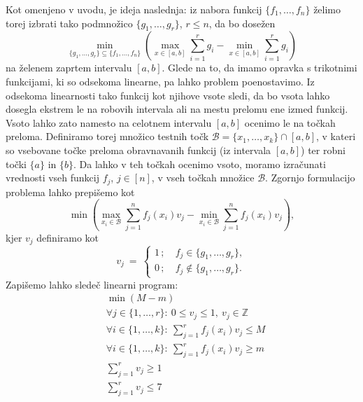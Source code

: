 \documentclass[11pt]{article}
\theoremstyle{definition}
\newcommand{\Z}{\mathbb{Z}}
\newcommand{\1}{\mathbbm{1}}
\newcommand{\set}[1]{\{#1\}}
\newcommand{\B}{\mathcal{B}}
\begin{document}
Kot omenjeno v uvodu, je ideja naslednja: iz nabora funkcij $\set{f_1,\ldots,f_n}$ želimo torej izbrati tako podmnožico $\set{g_1,\ldots,g_r}$, $r \leq n$, da bo dosežen
$$\min_{\set{g_1,\ldots,g_r} \subseteq \set{f_1,\ldots,f_n}}\left({\max_{x \in [a,b]}\sum_{i=1}^r g_i - \min_{x \in [a,b]}\sum_{i=1}^r g_i}\right)$$
na želenem zaprtem intervalu $[a,b]$. Glede na to, da imamo opravka s trikotnimi funkcijami, ki so odsekoma linearne, pa lahko problem poenostavimo. Iz odsekoma linearnosti tako funkcij kot njihove vsote sledi, da bo vsota lahko dosegla ekstrem le na robovih intervala ali na mestu prelomu ene izmed funkcij. Vsoto lahko zato namesto na celotnem intervalu $[a,b]$ ocenimo le na točkah preloma. Definiramo torej množico testnih točk $\mathcal{B} = \set{x_1,\ldots,x_k} \cap [a,b]$, v kateri so vsebovane točke preloma obravnavanih funkcij (iz intervala $[a,b]$) ter robni točki $\set{a}$ in $\set{b}$. Da lahko v teh točkah ocenimo vsoto, moramo izračunati vrednosti vseh funkcij $f_j$, $j \in [n]$, v vseh točkah množice $\B$. Zgornjo formulacijo problema lahko prepišemo kot
$$\min \left( \max_{x_i \in \B} \sum_{j=1}^n f_j(x_i)v_j - \min_{x_i \in \mathcal{B}} \sum_{j=1}^n f_j(x_i)v_j \right),$$
kjer $v_j$ definiramo kot
$$v_j ~=~ \begin{cases}
1\,; ~&f_j \in \set{g_1,\ldots,g_r}, \\
0\,; ~&f_j \notin \set{g_1,\ldots,g_r}.
\end{cases}$$
Zapišemo lahko sledeč linearni program:
\begin{align*}
&\min(M-m) \\
&\forall j \in \set{1,\ldots,r}: ~0 \leq v_j \leq 1, ~v_j \in \Z \\
&\forall i \in \set{1,\ldots,k}: ~\sum_{j=1}^r f_j(x_i)v_j \leq M \\
&\forall i \in \set{1,\ldots,k}: ~\sum_{j=1}^r f_j(x_i)v_j \geq m \\
&\sum_{j=1}^r v_j \geq 1 \\
&\sum_{j=1}^r v_j \leq 7
\end{align*}

\end{document}
